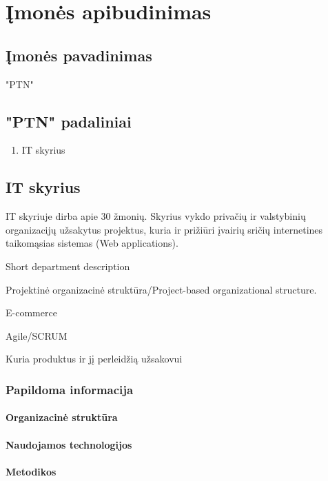 \section{Įmonės apibudinimas}

\subsection{Įmonės pavadinimas}
"PTN"

\subsection{"PTN" padaliniai}

\begin{enumerate}
    \item  IT skyrius
\end{enumerate}

\subsection{IT skyrius}

IT skyriuje dirba apie 30 žmonių. Skyrius vykdo privačių ir valstybinių organizacijų užsakytus projektus, kuria ir prižiūri įvairių sričių internetines taikomąsias sistemas (Web applications).

Short department description

Projektinė organizacinė struktūra/Project-based organizational structure.

E-commerce

Agile/SCRUM

Kuria produktus ir jį perleidžią užsakovui

\subsubsection{Papildoma informacija}

\paragraph{Organizacinė struktūra}
\paragraph{Naudojamos technologijos}
\paragraph{Metodikos}
